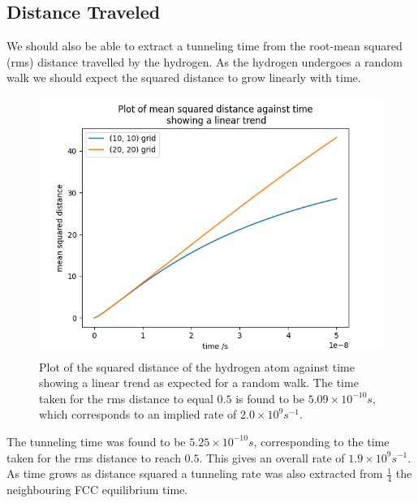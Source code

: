 \subsection{Distance Traveled}
We should also be able to
extract a tunneling time from
the root-mean squared (rms)
distance travelled by the
hydrogen. As the hydrogen
undergoes a random walk we should
expect the squared distance to
grow linearly with time.
\begin{figure}
    \centering
    \includegraphics[width=0.5\linewidth]{Figures/Redfield/Plot of lindblad solution squared distance.png}
    \caption{Plot of the squared distance
    of the hydrogen atom against time
    showing a linear trend as expected
    for a random walk. The time taken
    for the rms distance to equal \(0.5\)
    is found to be
    \(5.09\times{}10^{-10}s\),
    which corresponds to an implied rate
    of \(2.0 \times 10^{9}s^{-1}\).
    }
\end{figure}
The tunneling time was
found to be \(5.25\times{}10^{-10}s\),
corresponding to the time taken
for the rms distance to
reach \(0.5\). This gives
an overall rate of
\(1.9 \times 10^{9}s^{-1}\).
As time grows as distance squared
a tunneling rate was also
extracted from
\(\frac{1}{4}\) the
neighbouring FCC equilibrium
time.

